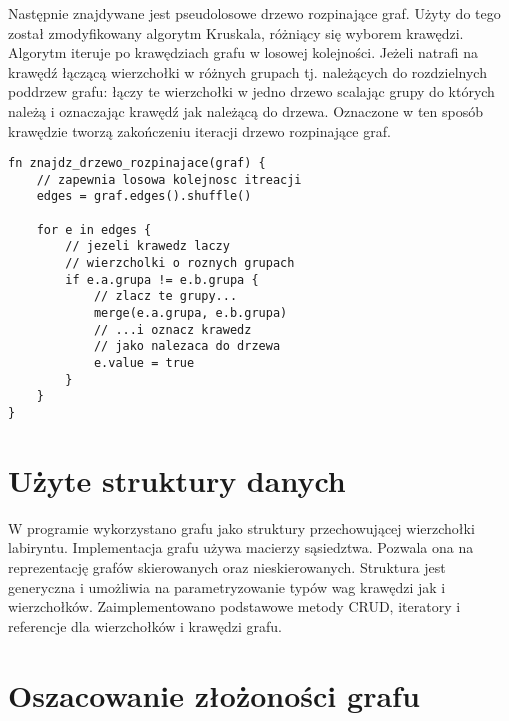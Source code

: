\documentclass[twocolumn]{article}
\begin{document}
Następnie znajdywane jest pseudolosowe drzewo rozpinające graf.
Użyty do tego został zmodyfikowany algorytm Kruskala, różniący się wyborem krawędzi.
Algorytm iteruje po krawędziach grafu w losowej kolejności.
Jeżeli natrafi na krawędź łączącą wierzchołki w różnych grupach tj. należących do rozdzielnych poddrzew grafu: łączy te wierzchołki w jedno drzewo scalając grupy do których należą i oznaczając krawędź jak należącą do drzewa.
Oznaczone w ten sposób krawędzie tworzą zakończeniu iteracji drzewo rozpinające graf.
\begin{lstlisting}
fn znajdz_drzewo_rozpinajace(graf) {
	// zapewnia losowa kolejnosc itreacji
	edges = graf.edges().shuffle()

	for e in edges {
		// jezeli krawedz laczy 
		// wierzcholki o roznych grupach
		if e.a.grupa != e.b.grupa {
			// zlacz te grupy...
			merge(e.a.grupa, e.b.grupa)
			// ...i oznacz krawedz
			// jako nalezaca do drzewa
			e.value = true
		}
	}
}
\end{lstlisting}

\section{Użyte struktury danych}
W programie wykorzystano grafu jako struktury przechowującej wierzchołki labiryntu.
Implementacja grafu używa macierzy sąsiedztwa. Pozwala ona na reprezentację grafów skierowanych oraz nieskierowanych.
Struktura jest generyczna i umożliwia na parametryzowanie typów wag krawędzi jak i wierzchołków.
Zaimplementowano podstawowe metody CRUD, iteratory i referencje dla wierzchołków i krawędzi grafu.

\section{Oszacowanie złożoności grafu}
\end{document}
